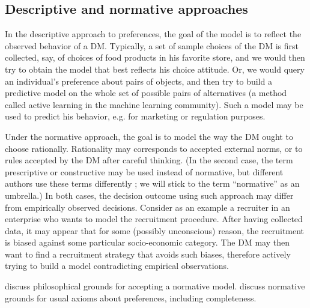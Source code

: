 \documentclass[french, english]{llncs}
\begin{document}
\subsection{Descriptive and normative approaches}
In the descriptive approach to preferences, the goal of the model is to reflect the observed behavior of a \ac{DM}. Typically, a set of sample choices of the \ac{DM} is first collected, say, of choices of food products in his favorite store, and we would then try to obtain the model that best reflects his choice attitude. Or, we would query an individual’s preference about pairs of objects, and then try to build a predictive model on the whole set of possible pairs of alternatives (a method called active learning in the machine learning community). Such a model may be used to predict his behavior, e.g. for marketing or regulation purposes. 

Under the normative approach, the goal is to model the way the \ac{DM} ought to choose rationally. Rationality may corresponds to accepted external norms, or to rules accepted by the \ac{DM} after careful thinking. (In the second case, the term prescriptive or constructive may be used instead of normative, but different authors use these terms differently \citep{roy_decision_1993, tsoukias_concept_2007}; we will stick to the term “normative” as an umbrella.) In both cases, the decision outcome using such approach may differ from empirically observed decisions. Consider as an example a recruiter in an enterprise who wants to model the recruitment procedure. After having collected data, it may appear that for some (possibly unconscious) reason, the recruitment is biased against some particular socio-economic category. The \ac{DM} may then want to find a recruitment strategy that avoids such biases, therefore actively trying to build a model contradicting empirical observations. 
	
\citet{mcclennen_rationality_1990, guala_logic_2000} discuss philosophical grounds for accepting a normative model. \citet{anand_are_1987, mandler_difficult_2001} discuss normative grounds for usual axioms about preferences, including completeness.
\end{document}
